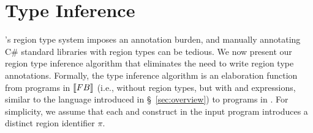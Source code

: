 \newcommand{\deltaPC}{\Delta_P^C}

\newcommand{\soln}{\eta}
\newcommand{\solnR}{\soln_R}
\newcommand{\solnP}{\soln_P}
\newcommand{\thesoln}{\hat{\eta}}
\newcommand{\thesolnR}{\thesoln_R}
\newcommand{\thesolnP}{\thesoln_P}

\newcommand{\saturate}[1]{{#1}^*}
\newcommand{\myground}[1]{\saturate{#1}_g}
\newcommand{\consOf}[1]{\textsc{GenConstraint}(#1)}
\newcommand{\satC}{\saturate{C}}
\newcommand{\groundC}{\myground{C}}
\newcommand{\rhoC}{\text{WF}_R}
\newcommand{\solveCon}[1]{\textsc{Solve}(#1)}

\section{Type Inference}
\label{sec:type-inference}

\name's region type system imposes an annotation burden, and
manually annotating C\# standard libraries with region types
can be tedious. We now present our region type inference algorithm
that eliminates the need to write region type annotations.
Formally, the type inference
algorithm is an elaboration function from programs in $\llbracket {\sc FB} \rrbracket$
(i.e., \FB without region types, but with  and 
expressions, similar to the language introduced in
\S~\ref{sec:overview}) to programs in \FB.
For simplicity, we assume that each  and  construct
in the input program introduces a distinct region identifier $\pi$.

